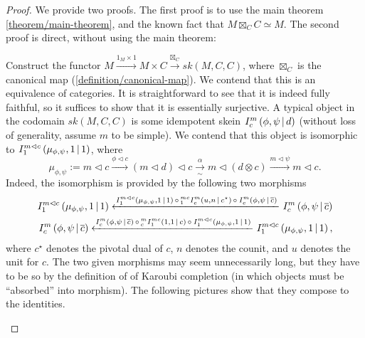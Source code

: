 \begin{proof}
  We provide two proofs. The first proof is to use the main theorem
  \ref{theorem/main-theorem}, and the known fact that
  $M \boxtimes_{C} C \simeq M$. The second proof is direct, without using the
  main theorem:

  Construct the functor
  $M \xrightarrow{1_{M} \times 1} M \times C \xrightarrow{\boxtimes_{C}} sk(M,C,C)$,
  where $\boxtimes_{C}$ is the canonical map (\ref{definition/canonical-map}).
  We contend that this is an equivalence of categories. It is straightforward
  to see that it is indeed fully faithful, so it suffices to show that it is
  essentially surjective. A typical object in the codomain $sk(M,C,C)$ is some
  idempotent skein ${}^{}_{} I^{m}_{c} \left( \phi, \psi \,\middle|\, d \right)$ (without loss of generality,
  assume $m$ to be simple). We contend that this object is isomorphic to
  ${}^{}_{} I^{m \lhd c}_{1} \left( \mu_{\phi, \psi}, 1 \,\middle|\, 1 \right)$, where
  \[
    \mu_{\phi,\psi} :=
    m \lhd c
    \xrightarrow{\phi \lhd c}
    (m \lhd d) \lhd c
    \xrightarrow[\sim]{\alpha}
    m \lhd (d \otimes c)
    \xrightarrow{m \lhd \psi}
    m \lhd c.
  \]
  Indeed, the isomorphism is provided by the following two morphisms
  \begin{align*}
    {}^{}_{} I^{m \lhd c}_{1} \left( \mu_{\phi, \psi}, 1 \,\middle|\, 1 \right)
    \xleftarrow{
    {}^{}_{} I^{m \lhd c}_{1} \left( \mu_{\phi, \psi}, 1 \,\middle|\, 1 \right)
    \, \circ \,
    {}^{mc}_{1} I^{m}_{c} \left( u, n \,\middle|\, c^{\star} \right)
    \, \circ \,
    {}^{}_{} I^{m}_{c} \left( \phi, \psi \,\middle|\, \overline{c} \right)}
    {}^{}_{} I^{m}_{c} \left( \phi, \psi \,\middle|\, \overline{c} \right)
    \\
    {}^{}_{} I^{m}_{c} \left( \phi, \psi \,\middle|\, \overline{c} \right)
    \xleftarrow{
    {}^{}_{} I^{m}_{c} \left( \phi, \psi \,\middle|\, \overline{c} \right)
    \, \circ \,
    {}^{m}_{c} I^{mc}_{1} \left( 1, 1 \,\middle|\, c \right)
    \, \circ \,
    {}^{}_{} I^{m \lhd c}_{1} \left( \mu_{\phi, \psi}, 1 \,\middle|\, 1 \right)
    }
    {}^{}_{} I^{m \lhd c}_{1} \left( \mu_{\phi, \psi}, 1 \,\middle|\, 1 \right),
  \end{align*}
  where $c^{\star}$ denotes the pivotal dual of $c$, $n$ denotes the counit,
  and $u$ denotes the unit for $c$. The two given morphisms may seem
  unnecessarily long, but they have to be so by the definition of of Karoubi
  completion (in which objects must be ``absorbed'' into morphism). The following pictures show that they compose to the identities.


  \begin{center}
    
  \end{center}
\end{proof}


